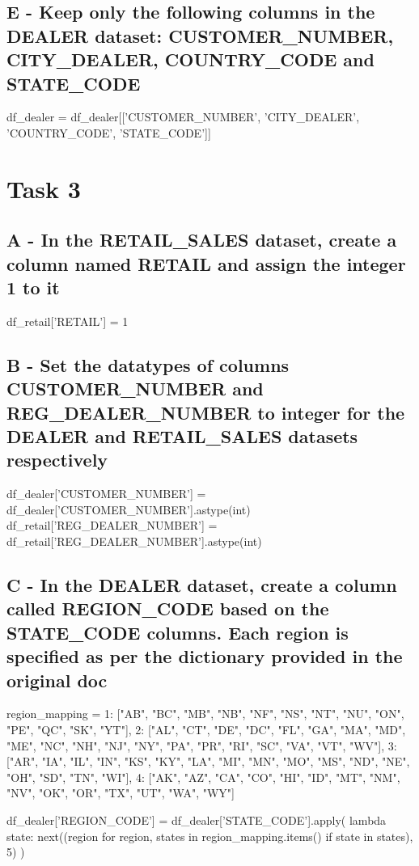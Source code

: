 \documentclass[a4paper, 12pt]{article}
\begin{document}
\subsection{E - Keep only the following columns in the DEALER dataset: CUSTOMER\_NUMBER, CITY\_DEALER, COUNTRY\_CODE and STATE\_CODE}

\begin{python}
	df_dealer = df_dealer[['CUSTOMER_NUMBER', 'CITY_DEALER', 'COUNTRY_CODE', 'STATE_CODE']]
\end{python}

\section{Task 3}

\subsection{A - In the RETAIL\_SALES dataset, create a column named RETAIL and assign the integer 1 to it}

\begin{python}
	df_retail['RETAIL'] = 1
\end{python}

\subsection{B - Set the datatypes of columns CUSTOMER\_NUMBER and REG\_DEALER\_NUMBER to integer for the DEALER and RETAIL\_SALES datasets respectively}

\begin{python}
	df_dealer['CUSTOMER_NUMBER'] = df_dealer['CUSTOMER_NUMBER'].astype(int)
	df_retail['REG_DEALER_NUMBER'] = df_retail['REG_DEALER_NUMBER'].astype(int)
\end{python}

\subsection{C - In the DEALER dataset, create a column called REGION\_CODE based on the STATE\_CODE columns. Each region is specified as per the dictionary provided in the original doc}

\begin{python}
	region_mapping = {
		1: ["AB", "BC", "MB", "NB", "NF", 
			  "NS", "NT", "NU", "ON", "PE", 
			  "QC", "SK", "YT"],
		2: ["AL", "CT", "DE", "DC", "FL", 
			  "GA", "MA", "MD", "ME", "NC", 
			  "NH", "NJ", "NY", "PA", "PR", 
			  "RI", "SC", "VA", "VT", "WV"],
		3: ["AR", "IA", "IL", "IN", "KS", 
			  "KY", "LA", "MI", "MN", "MO", 
			  "MS", "ND", "NE", "OH", "SD", 
			  "TN", "WI"],
		4: ["AK", "AZ", "CA", "CO", "HI", 
			  "ID", "MT", "NM", "NV", "OK", 
			  "OR", "TX", "UT", "WA", "WY"]
	}
	
	df_dealer['REGION_CODE'] = df_dealer['STATE_CODE'].apply(
	lambda state: next((region for region, states in region_mapping.items() if state in states), 5)
	)
\end{python}
\end{document}
